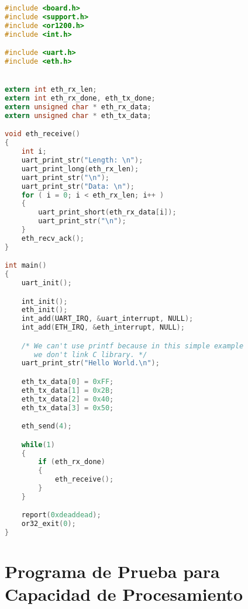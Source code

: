 \begin{lstlisting}[language=C,frame=single]
#include <board.h>
#include <support.h>
#include <or1200.h>
#include <int.h>

#include <uart.h>
#include <eth.h>


extern int eth_rx_len;
extern int eth_rx_done, eth_tx_done;
extern unsigned char * eth_rx_data;
extern unsigned char * eth_tx_data;

void eth_receive()
{
	int i;
	uart_print_str("Length: \n");
	uart_print_long(eth_rx_len);
	uart_print_str("\n");
	uart_print_str("Data: \n");
	for ( i = 0; i < eth_rx_len; i++ )
	{
		uart_print_short(eth_rx_data[i]);
		uart_print_str("\n");
	}
	eth_recv_ack();
}

int main()
{
	uart_init();

	int_init();
	eth_init();
	int_add(UART_IRQ, &uart_interrupt, NULL);
	int_add(ETH_IRQ, &eth_interrupt, NULL);

	/* We can't use printf because in this simple example
	   we don't link C library. */
	uart_print_str("Hello World.\n");

	eth_tx_data[0] = 0xFF;
	eth_tx_data[1] = 0x2B;
	eth_tx_data[2] = 0x40;
	eth_tx_data[3] = 0x50;

	eth_send(4);

	while(1)
	{
		if (eth_rx_done)
		{
			eth_receive();
		}
	}

	report(0xdeaddead);
	or32_exit(0);
}
\end{lstlisting}


 \section{Programa de Prueba para Capacidad de Procesamiento}

